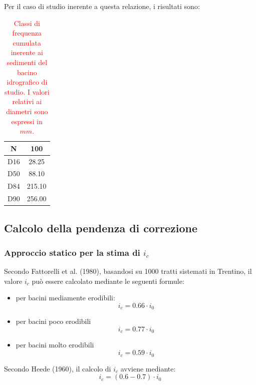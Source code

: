 Per il caso di studio inerente a questa relazione, i risultati sono:
\begin{table}[H]\centering
    \caption{\textcolor{red}{Classi di frequenza cumulata inerente ai sedimenti del bacino idrografico di studio. I valori relativi ai diametri sono espressi in $mm$.}}
    \begin{tabular}{cc}
    \toprule
    N   & 100      \\
    \midrule
    D16 & 28.25    \\
    D50 & 88.10    \\
    D84 & 215.10   \\
    D90 & 256.00   \\
    \bottomrule
    \end{tabular}
    \end{table}

\subsection{Calcolo della pendenza di correzione}
\subsubsection{Approccio statico per la stima di $i_c$}
Secondo Fattorelli et al. (1980), basandosi su 1000 tratti sistemati in Trentino, il valore $i_c$ può essere calcolato mediante le seguenti formule:
\begin{itemize}
    \item per bacini mediamente erodibili:
\begin{equation}
    i_c = 0.66 \cdot i_0 
\end{equation}
\item per bacini poco erodibili
\begin{equation}
    i_c = 0.77 \cdot i_0 
\end{equation}
\item per bacini molto erodibili
\begin{equation}
    i_c = 0.59 \cdot i_0 
\end{equation}
\end{itemize}
 
Secondo Heede (1960), il calcolo di $i_c$ avviene mediante:
\begin{equation}
    i_c = (0.6 - 0.7) \cdot i_0
\end{equation}

